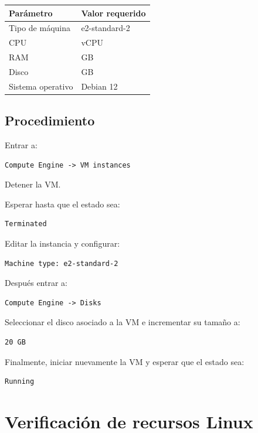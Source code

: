 \documentclass[
  coursetitle={Cómputo Nube y Tecnologías Emergentes},
  coursehours={96},
  coursedate={Verano 2026},
  doctype={Laboratorio},
  otherlangs={english,french},
  authorname={Lázaro},
  authorsurname={Bustio-Martínez},
  authortitle={PhD},
  role={Profesor Investigador},
  email={lbustio@inaoe.mx},
  phone={5559504000},
  ext={7459},
  institution={Instituto Nacional de Astrofísica, Óptica y Electrónica (INAOE)},
  department={Maestría en Ciencias en Tecnologías de Seguridad},
  address={Luis Enrique Erro 1, Sta. Ma. Tonantzintla, San Andrés Cholula, CP 72840, Puebla, México},
  margin={0.5in}
]{../../lbustio_lecture_notes}
\begin{document}
\begin{center}
\begin{tabularx}{0.8\textwidth}{|>{\raggedright\arraybackslash}X|>{\raggedright\arraybackslash}X|}
\hline
\textbf{Parámetro} & \textbf{Valor requerido} \\
\hline
Tipo de máquina & e2-standard-2 \\
\hline
CPU & 2 vCPU \\
\hline
RAM & 8 GB \\
\hline
Disco & 20 GB \\
\hline
Sistema operativo & Debian 12 \\
\hline
\end{tabularx}
\end{center}

\subsection{Procedimiento}

Entrar a:

\begin{verbatim}
Compute Engine -> VM instances
\end{verbatim}

Detener la VM.

Esperar hasta que el estado sea:

\begin{verbatim}
Terminated
\end{verbatim}

Editar la instancia y configurar:

\begin{verbatim}
Machine type: e2-standard-2
\end{verbatim}

Después entrar a:

\begin{verbatim}
Compute Engine -> Disks
\end{verbatim}

Seleccionar el disco asociado a la VM e incrementar su tamaño a:

\begin{verbatim}
20 GB
\end{verbatim}

Finalmente, iniciar nuevamente la VM y esperar que el estado sea:

\begin{verbatim}
Running
\end{verbatim}

\section{Verificación de recursos Linux}
\end{document}

